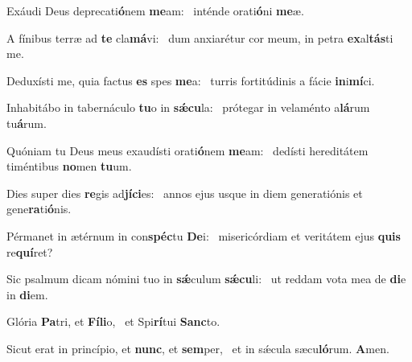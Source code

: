 \item Exáudi Deus deprecati\textbf{ó}nem \textbf{me}am:~\psstar{} inténde orati\textbf{ó}ni \textbf{me}æ.
\item A fínibus terræ ad \textbf{te} cla\textbf{má}vi:~\psstar{} dum anxiarétur cor meum, in petra \textbf{ex}al\textbf{tás}ti me.
\item Deduxísti me, quia factus \textbf{es} spes \textbf{me}a:~\psstar{} turris fortitúdinis a fácie \textbf{in}i\textbf{mí}ci.
\item Inhabitábo in tabernáculo \textbf{tu}o in \textbf{sǽ}\textbf{cu}la:~\psstar{} prótegar in velaménto a\textbf{lá}rum tu\textbf{á}rum.
\item Quóniam tu Deus meus exaudísti orati\textbf{ó}nem \textbf{me}am:~\psstar{} dedísti hereditátem timéntibus \textbf{no}men \textbf{tu}um.
\item Dies super dies \textbf{re}gis ad\textbf{jí}\textbf{ci}es:~\psstar{} annos ejus usque in diem generatiónis et gene\textbf{ra}ti\textbf{ó}nis.
\item Pérmanet in ætérnum in con\textbf{spéc}tu \textbf{De}i:~\psstar{} misericórdiam et veritátem ejus \textbf{quis} re\textbf{quí}ret?
\item Sic psalmum dicam nómini tuo in \textbf{sǽ}culum \textbf{sǽ}\textbf{cu}li:~\psstar{} ut reddam vota mea de \textbf{di}e in \textbf{di}em.
\item Glória \textbf{Pa}tri, et \textbf{Fí}\textbf{li}o,~\psstar{} et Spi\textbf{rí}tui \textbf{Sanc}to.
\item Sicut erat in princípio, et \textbf{nunc}, et \textbf{sem}per,~\psstar{} et in sǽcula sæcu\textbf{ló}rum. \textbf{A}men.